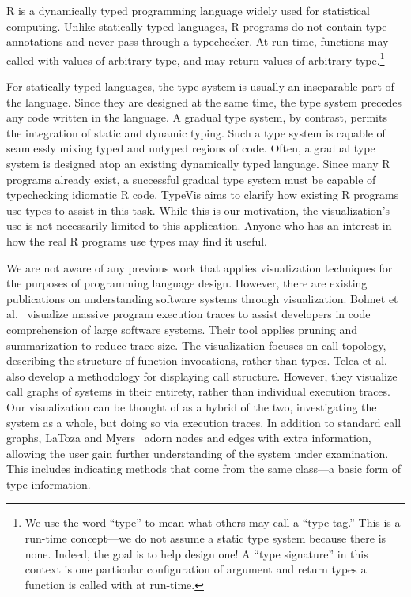 \documentclass{vgtc}                          %
\begin{document}
R is a dynamically typed programming language widely used for
statistical computing. Unlike statically typed languages,
R programs do not contain type annotations
and never pass through a typechecker.
At run-time,
functions may called with values of arbitrary type,
and may return values of arbitrary type.\footnote{
  We use the word ``type'' to mean what others may call a ``type tag.''
  This is a run-time concept---we do not assume a static type system
  because there is none. Indeed, the goal is to help design one!
  A ``type signature'' in this context is one particular configuration
  of argument and return types a function is called with at run-time.
}

For statically typed languages, the type system is usually
an inseparable part of the language. Since they are designed
at the same time, the type system precedes any code written
in the language.
A gradual type system, by contrast,
permits the integration of static and dynamic typing.
Such a type system is capable of seamlessly mixing typed and untyped regions of code.
Often, a gradual type system is designed atop
an existing dynamically typed language.
Since many R programs already exist,
a successful gradual type system must be capable of
typechecking idiomatic R code.
{\sc TypeVis} aims to clarify how existing R programs
use types to assist in this task.
While this is our motivation, the visualization's use
is not necessarily limited to this application.
Anyone who has an interest in how the real R programs use types
may find it useful.

We are not aware of any previous work that applies
visualization techniques for the purposes of programming language design.
However, there are existing publications on understanding
software systems through visualization.
Bohnet et al.~\cite{bohnet:2009} visualize massive program execution traces
to assist developers in code comprehension of large software systems.
Their tool applies pruning and summarization to reduce trace size.
The visualization focuses on call topology,
describing the structure of function invocations,
rather than types.
Telea et al.~\cite{telea:2009} also develop a methodology for displaying call structure.
However, they visualize call graphs of systems in their entirety,
rather than individual execution traces.
Our visualization can be thought of as a hybrid of the two,
investigating the system as a whole,
but doing so via execution traces.
In addition to standard call graphs,
LaToza and Myers~\cite{latoza:2011} adorn nodes and edges with extra information,
allowing the user gain further understanding of the system
under examination.
This includes indicating methods that come from the same class---a
basic form of type information.
\end{document}
